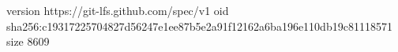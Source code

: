 version https://git-lfs.github.com/spec/v1
oid sha256:c19317225704827d56247e1ee87b5e2a91f12162a6ba196e110db19c81118571
size 8609
